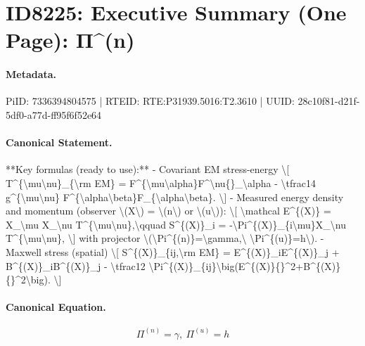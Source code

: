 \section*{ID8225: Executive Summary (One Page): Π\textasciicircum{}(n)}
\paragraph{Metadata.}
PiID: 7336394804575 | RTEID: RTE:P31939.5016:T2.3610 | UUID: 28c10f81-d21f-5df0-a77d-ff95f6f52e64

\paragraph{Canonical Statement.}
**Key formulas (ready to use):** - Covariant EM stress-energy \textbackslash{}[ T\textasciicircum{}\{\textbackslash{}mu\textbackslash{}nu\}\_\{\textbackslash{}rm EM\} = F\textasciicircum{}\{\textbackslash{}mu\textbackslash{}alpha\}F\textasciicircum{}\textbackslash{}nu\{\}\_\textbackslash{}alpha - \textbackslash{}tfrac14 g\textasciicircum{}\{\textbackslash{}mu\textbackslash{}nu\} F\textasciicircum{}\{\textbackslash{}alpha\textbackslash{}beta\}F\_\{\textbackslash{}alpha\textbackslash{}beta\}. \textbackslash{}] - Measured energy density and momentum (observer \textbackslash{}(X\textbackslash{}) = \textbackslash{}(n\textbackslash{}) or \textbackslash{}(u\textbackslash{})): \textbackslash{}[ \textbackslash{}mathcal E\textasciicircum{}\{(X)\} = X\_\textbackslash{}mu X\_\textbackslash{}nu T\textasciicircum{}\{\textbackslash{}mu\textbackslash{}nu\},\textbackslash{}qquad S\textasciicircum{}\{(X)\}\_i = -\textbackslash{}Pi\textasciicircum{}\{(X)\}\_\{i\textbackslash{}mu\}X\_\textbackslash{}nu T\textasciicircum{}\{\textbackslash{}mu\textbackslash{}nu\}, \textbackslash{}] with projector \textbackslash{}(\textbackslash{}Pi\textasciicircum{}\{(n)\}=\textbackslash{}gamma,\textbackslash{} \textbackslash{}Pi\textasciicircum{}\{(u)\}=h\textbackslash{}). - Maxwell stress (spatial) \textbackslash{}[ S\textasciicircum{}\{(X)\}\_\{ij,\textbackslash{}rm EM\} = E\textasciicircum{}\{(X)\}\_iE\textasciicircum{}\{(X)\}\_j + B\textasciicircum{}\{(X)\}\_iB\textasciicircum{}\{(X)\}\_j - \textbackslash{}tfrac12 \textbackslash{}Pi\textasciicircum{}\{(X)\}\_\{ij\}\textbackslash{}big(E\textasciicircum{}\{(X)\}\{\}\textasciicircum{}2+B\textasciicircum{}\{(X)\}\{\}\textasciicircum{}2\textbackslash{}big). \textbackslash{}]

\paragraph{Canonical Equation.}
\[
\Pi^{(n)}=\gamma,\ \Pi^{(u)}=h
\]

